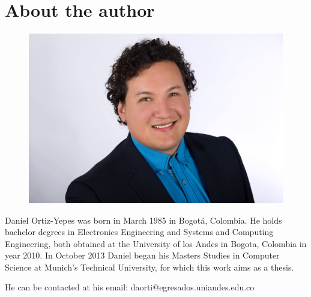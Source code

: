 \chapter{About the author}
\thispagestyle{empty}


\begin{figure}[h]
\hspace{75mm}
		\includegraphics[width=.4\textwidth]{figures/dortiz-portrait.eps}
		\label{fig:me}
\end{figure}

\vspace{15mm}

Daniel Ortiz-Yepes was born in March 1985 in Bogot\'a, Colombia. He holds bachelor degrees in Electronics Engineering and Systems and Computing Engineering, both obtained at the University of los Andes in Bogota, Colombia in year 2010. In October 2013 Daniel began his Masters Studies in Computer Science at Munich's Technical University, for which this work aims as a thesis. 

\vspace{20mm}
\begin{flushright}
He can be contacted at his email: daorti@egresados.uniandes.edu.co
\end{flushright}


\vspace{1cm}
